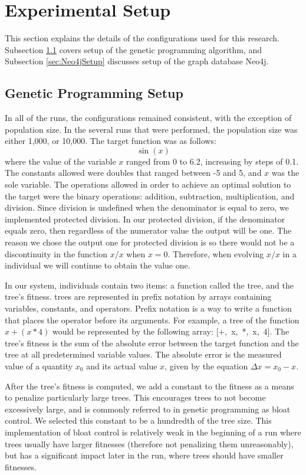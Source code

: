 \documentclass[12pt]{article}
\begin{document}
\section{Experimental Setup} 
\label{sec:experiments}

This section explains the details of the configurations used for this research. Subsection \ref{sec:GPSetup} covers setup of the genetic programming algorithm, and Subsection \ref{sec:Neo4jSetup} discusses setup of the graph database Neo4j.

\subsection{Genetic Programming Setup}
\label{sec:GPSetup}

In all of the runs, the configurations remained consistent, with the exception of population size. In the several runs that were performed, the population size was either 1,000, or 10,000. The target function was as follows:
\[
    \sin(x)
\]
where the value of the variable $x$ ranged from 0 to 6.2, increasing by steps of 0.1. The constants allowed were doubles that ranged between -5 and 5, and $x$ was the sole variable. The operations allowed in order to achieve an optimal solution to the target were the binary operations: addition, subtraction, multiplication, and division. Since division is undefined when the denominator is equal to zero, we implemented protected division. In our protected division, if the denominator equals zero, then regardless of the numerator value the output will be one. The reason we chose the output one for protected division is so there would not be a discontinuity in the function $x/x$ when $x = 0$. Therefore, when evolving $x/x$ in a individual we will continue to obtain the value one.

In our system, individuals contain two items: a function called the tree, and the tree's fitness. trees are represented in prefix notation by arrays containing variables, constants, and operators. Prefix notation is a way to write  a function that places the operator before its arguments. For example, a tree of the function $x + (x * 4)$ would be represented by the following array: [+,~x,~*,~x,~4]. The tree's fitness is the sum of the absolute error between the target function and the tree at all predetermined variable values. The absolute error is  the measured value of a quantity $x_{0}$ and its actual value $x$, given by the equation $\Delta x=x_{0}-x$.

After the tree's fitness is computed, we add a constant to the fitness as a means to penalize particularly large trees. This encourages trees to not become excessively large, and is commonly referred to in genetic programming as bloat control. We selected this constant to be a hundredth of the tree size. This implementation of bloat control is relatively weak in the beginning of a run where trees usually have larger fitnesses (therefore not penalizing them unreasonably), but has a significant impact later in the run, where trees should have smaller fitnesses.
\end{document}
